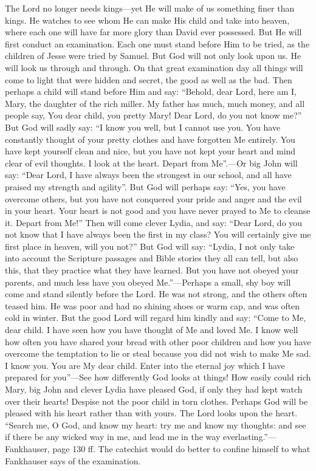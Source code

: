 The Lord no longer needs kings—yet He will make of us something finer than kings. He watches to see whom He can make His child and take into heaven, where each one will have far more glory than David ever possessed. But He will first conduct an examination. Each one must stand before Him to be tried, as the children of Jesse were tried by Samuel. But God will not only look upon us. He will look us through and through. On that great examination day all things will come to light that were hidden and secret, the good as well as the bad. Then perhaps a child will stand before Him and say: “Behold, dear Lord, here am I, Mary, the daughter of the
rich miller. My father has much, much money, and all people say, You dear child, you pretty Mary! Dear Lord, do you not know me?” But God will sadly say: “I know you well, but I cannot use you. You have constantly thought of your pretty clothes and have forgotten Me entirely. You have kept yourself clean and nice, but you have not kept your heart and mind clear of evil thoughts. I look at the heart. Depart from Me”.—Or big John will say: “Dear Lord, I have always been the strongest in our school, and all have praised my strength and agility”. But God will perhaps say: “Yes, you have overcome others, but you have not conquered your pride and anger and the evil in your heart. Your heart is not good and you have never prayed to Me to cleanse it. Depart from Me!” Then will come clever Lydia, and say: “Dear Lord, do you not know that I have always been the first in my class? You will certainly give me first place in heaven, will you not?” But God will say: “Lydia, I not only take into account the Scripture passages and Bible stories they all can tell, but also this, that they practice what they have learned. But you have not obeyed your parents, and much less have you obeyed Me.”—Perhaps a small, shy boy will come and stand silently before the Lord. He was not strong, and the others often teased him. He was poor and had no shining shoes or warm cap, and was often cold in winter. But the good Lord will regard him kindly and say: “Come to Me, dear child. I have seen how you have thought of Me and loved Me. I know well how often you have shared your bread with other poor children and how you have overcome the temptation to lie or steal because you did not wish to make Me sad. I know you. You are My dear child. Enter into the eternal joy which I have prepared for you”—See how differently God looks at things! How easily could rich Mary, big John and clever Lydia have pleased God, if only they had kept watch over their hearts! Despise not the poor child in torn clothes. Perhaps God will be pleased with his heart rather than with yours. The Lord looks upon the heart. “Search me, O God, and know my heart: try me and know my thoughts: and see if there be any wicked way in me, and lead me in the way everlasting.”—Fankhauser, page 130 ff. The catechist would do better to confine himself to what Fankhauser says of the examination.

